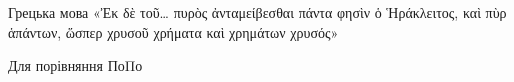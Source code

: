 \documentclass{kapital}
\begin{document}
    Грецька мова \textgreek{«Ἐκ δὲ τοῦ\dots{} πυρὸς ἀνταμείβεσθαι πάντα φησὶν ὁ Ἡράκλειτος, καὶ πὺρ ἁπάντων, ὥσπερ χρυσοῦ χρήματα καὶ χρημάτων χρυσός»}

    Для порівняння По\textgreek{Πο}
\end{document}
